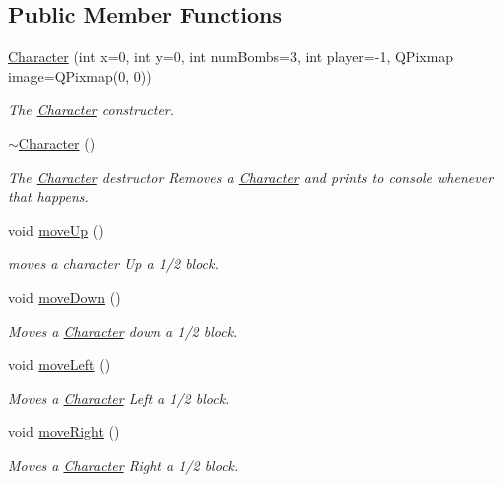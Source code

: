 \subsection*{Public Member Functions}
\begin{DoxyCompactItemize}
\item 
\hyperlink{class_character_a61a4fabd534a280ff4b7fc6ad18c152e}{Character} (int x=0, int y=0, int num\-Bombs=3, int player=-\/1, Q\-Pixmap image=Q\-Pixmap(0, 0))
\begin{DoxyCompactList}\small\item\em The \hyperlink{class_character}{Character} constructer. \end{DoxyCompactList}\item 
\hyperlink{class_character_a9e9be564d05ded80962b2045aa70b3fc}{$\sim$\-Character} ()
\begin{DoxyCompactList}\small\item\em The \hyperlink{class_character}{Character} destructor Removes a \hyperlink{class_character}{Character} and prints to console whenever that happens. \end{DoxyCompactList}\item 
void \hyperlink{class_character_a5e63747ea61305391cd0ada0898e485c}{move\-Up} ()
\begin{DoxyCompactList}\small\item\em moves a character Up a 1/2 block. \end{DoxyCompactList}\item 
void \hyperlink{class_character_afa7763e81bca6a0b9b0c044f39c429f0}{move\-Down} ()
\begin{DoxyCompactList}\small\item\em Moves a \hyperlink{class_character}{Character} down a 1/2 block. \end{DoxyCompactList}\item 
void \hyperlink{class_character_a88dfc867ab226d3f115b891fc3b34d67}{move\-Left} ()
\begin{DoxyCompactList}\small\item\em Moves a \hyperlink{class_character}{Character} Left a 1/2 block. \end{DoxyCompactList}\item 
void \hyperlink{class_character_a0a8bf66e3d70c196a0fa8ce183f4aeb4}{move\-Right} ()
\begin{DoxyCompactList}\small\item\em Moves a \hyperlink{class_character}{Character} Right a 1/2 block. \end{DoxyCompactList}\item 

\end{DoxyCompactItemize}
